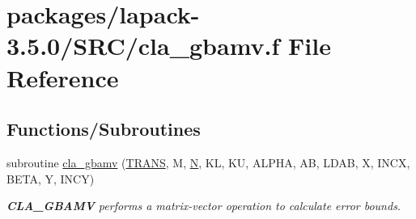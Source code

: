 \hypertarget{cla__gbamv_8f}{}\section{packages/lapack-\/3.5.0/\+S\+R\+C/cla\+\_\+gbamv.f File Reference}
\label{cla__gbamv_8f}
\subsection*{Functions/\+Subroutines}
\begin{DoxyCompactItemize}
\item 
subroutine \hyperlink{group__complexGBcomputational_ga76fe8e17a61e9711770b9337d22982b9}{cla\+\_\+gbamv} (\hyperlink{superlu__enum__consts_8h_a0c4e17b2d5cea33f9991ccc6a6678d62a1f61e3015bfe0f0c2c3fda4c5a0cdf58}{T\+R\+A\+N\+S}, M, \hyperlink{polmisc_8c_a0240ac851181b84ac374872dc5434ee4}{N}, K\+L, K\+U, A\+L\+P\+H\+A, A\+B, L\+D\+A\+B, X, I\+N\+C\+X, B\+E\+T\+A, Y, I\+N\+C\+Y)
\begin{DoxyCompactList}\small\item\em {\bfseries C\+L\+A\+\_\+\+G\+B\+A\+M\+V} performs a matrix-\/vector operation to calculate error bounds. \end{DoxyCompactList}\end{DoxyCompactItemize}
